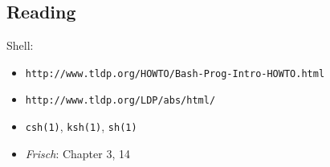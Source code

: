 \documentclass[xga]{xdvislides}
\begin{document}
\subsection{Reading}
Shell:
\begin{itemize}
	\item \verb+http://www.tldp.org/HOWTO/Bash-Prog-Intro-HOWTO.html+
	\item \verb+http://www.tldp.org/LDP/abs/html/+
	\item \verb+csh(1)+, \verb+ksh(1)+, \verb+sh(1)+
	\item {\em Frisch}: Chapter 3, 14
\end{itemize}
\end{document}
